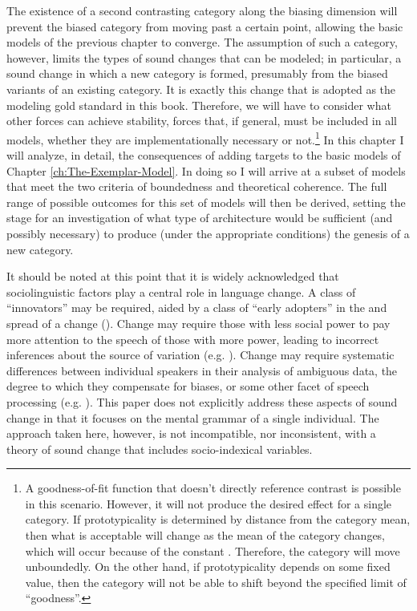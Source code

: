 The existence of a second contrasting category along the biasing dimension
will prevent the biased category from moving past a certain point,
allowing the basic  models of the previous chapter to converge.
The assumption of such a category, however, limits the types of sound
changes that can be modeled; in particular, a sound change in which
a new category is formed, presumably from the biased variants of an
existing category. It is exactly this change that is adopted as the
modeling gold standard in this book. Therefore, we will have to consider
what other forces can achieve stability, forces that, if general,
must be included in all models, whether they are implementationally
necessary or not.\footnote{A goodness-of-fit function that doesn't directly reference contrast
is possible in this scenario. However, it will not produce the desired
effect for a single category. If prototypicality is determined by
distance from the category mean, then what is acceptable will change
as the mean of the category changes, which will occur because of the
constant  . Therefore, the category will move unboundedly.
On the other hand, if prototypicality depends on some fixed value,
then the category will not be able to shift beyond the specified limit
of ``goodness''.} In this chapter I will analyze, in detail, the consequences of
adding  targets to the basic  models of Chapter
\ref{ch:The-Exemplar-Model}. In doing so I will arrive at a subset
of models that meet the two criteria of boundedness and theoretical
coherence. The full range of possible outcomes for this set of models
will then be derived, setting the stage for an investigation of what
type of architecture would be sufficient (and possibly necessary)
to produce (under the appropriate conditions) the genesis of a new
 category.

It should be noted at this point that it is widely acknowledged that
sociolinguistic factors play a central role in language change. A
class of ``innovators'' may be required, aided by a class of ``early
adopters'' in the  and spread of a change (\citealt{milroy1985linguistic}).
Change may require those with less social power to pay more attention
to the speech of those with more power, leading to incorrect inferences
about the source of  variation (e.g. \citealt{Garrett2013}).
Change may require systematic differences between individual speakers
in their analysis of ambiguous data, the degree to which they compensate
for  biases, or some other facet of speech processing (e.g.
\citealp{Beddor2009,yu2013socio}). This paper does not explicitly
address these aspects of sound change in that it focuses on the mental
grammar of a single individual. The approach taken here, however,
is not incompatible, nor inconsistent, with a theory of sound change
that includes socio-indexical variables.

